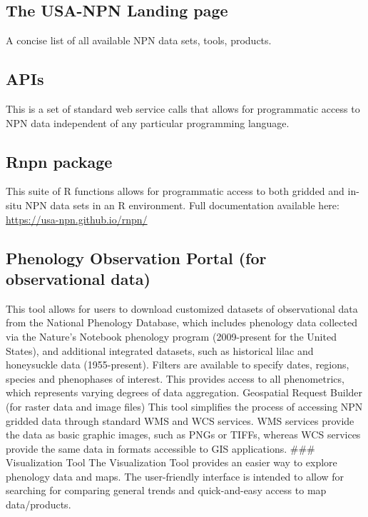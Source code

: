 \documentclass[]{book}
\begin{document}
\hypertarget{the-usa-npn-landing-page}{%
\subsection{The USA-NPN Landing page}\label{the-usa-npn-landing-page}}

A concise list of all available NPN data sets, tools, products.

\hypertarget{apis}{%
\subsection{APIs}\label{apis}}

This is a set of standard web service calls that allows for programmatic access to NPN data independent of any particular programming language.

\hypertarget{rnpn-package}{%
\subsection{Rnpn package}\label{rnpn-package}}

This suite of R functions allows for programmatic access to both gridded and in-situ NPN data sets in an R environment. Full documentation available here: \url{https://usa-npn.github.io/rnpn/}

\hypertarget{phenology-observation-portal-for-observational-data}{%
\subsection{Phenology Observation Portal (for observational data)}\label{phenology-observation-portal-for-observational-data}}

This tool allows for users to download customized datasets of observational data from the National Phenology Database, which includes phenology data collected via the Nature's Notebook phenology program (2009-present for the United States), and additional integrated datasets, such as historical lilac and honeysuckle data (1955-present). Filters are available to specify dates, regions, species and phenophases of interest. This provides access to all phenometrics, which represents varying degrees of data aggregation.
Geospatial Request Builder (for raster data and image files)
This tool simplifies the process of accessing NPN gridded data through standard WMS and WCS services. WMS services provide the data as basic graphic images, such as PNGs or TIFFs, whereas WCS services provide the same data in formats accessible to GIS applications.
\#\#\# Visualization Tool
The Visualization Tool provides an easier way to explore phenology data and maps. The user-friendly interface is intended to allow for searching for comparing general trends and quick-and-easy access to map data/products.
\end{document}
